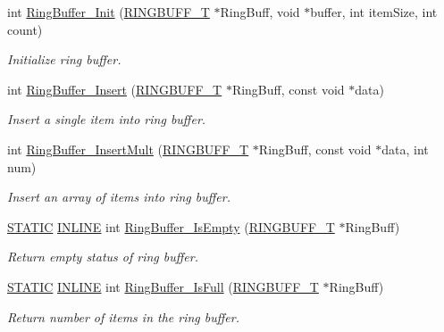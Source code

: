 \begin{DoxyCompactItemize}
int \hyperlink{group__Ring__Buffer_gaaf3bb51f2228ea1bea603e19c7eba5bb}{Ring\+Buffer\+\_\+\+Init} (\hyperlink{structRINGBUFF__T}{R\+I\+N\+G\+B\+U\+F\+F\+\_\+T} $\ast$Ring\+Buff, void $\ast$buffer, int item\+Size, int count)
\begin{DoxyCompactList}\small\item\em Initialize ring buffer. \end{DoxyCompactList}\item 
int \hyperlink{group__Ring__Buffer_gaafdee54f2525b2c7a983d1a631b42226}{Ring\+Buffer\+\_\+\+Insert} (\hyperlink{structRINGBUFF__T}{R\+I\+N\+G\+B\+U\+F\+F\+\_\+T} $\ast$Ring\+Buff, const void $\ast$data)
\begin{DoxyCompactList}\small\item\em Insert a single item into ring buffer. \end{DoxyCompactList}\item 
int \hyperlink{group__Ring__Buffer_gafeafb521d4e03052ab2c893fd0e388d5}{Ring\+Buffer\+\_\+\+Insert\+Mult} (\hyperlink{structRINGBUFF__T}{R\+I\+N\+G\+B\+U\+F\+F\+\_\+T} $\ast$Ring\+Buff, const void $\ast$data, int num)
\begin{DoxyCompactList}\small\item\em Insert an array of items into ring buffer. \end{DoxyCompactList}\item 
\hyperlink{group__LPC__Types__Public__Macros_ga10b2d890d871e1489bb02b7e70d9bdfb}{S\+T\+A\+T\+IC} \hyperlink{group__LPC__Types__Public__Types_ga2eb6f9e0395b47b8d5e3eeae4fe0c116}{I\+N\+L\+I\+NE} int \hyperlink{group__Ring__Buffer_ga6f03e04a69262864bde4f35fc6f3dfb5}{Ring\+Buffer\+\_\+\+Is\+Empty} (\hyperlink{structRINGBUFF__T}{R\+I\+N\+G\+B\+U\+F\+F\+\_\+T} $\ast$Ring\+Buff)
\begin{DoxyCompactList}\small\item\em Return empty status of ring buffer. \end{DoxyCompactList}\item 
\hyperlink{group__LPC__Types__Public__Macros_ga10b2d890d871e1489bb02b7e70d9bdfb}{S\+T\+A\+T\+IC} \hyperlink{group__LPC__Types__Public__Types_ga2eb6f9e0395b47b8d5e3eeae4fe0c116}{I\+N\+L\+I\+NE} int \hyperlink{group__Ring__Buffer_ga760da012435262add1d8d7aa79e873a0}{Ring\+Buffer\+\_\+\+Is\+Full} (\hyperlink{structRINGBUFF__T}{R\+I\+N\+G\+B\+U\+F\+F\+\_\+T} $\ast$Ring\+Buff)
\begin{DoxyCompactList}\small\item\em Return number of items in the ring buffer. \end{DoxyCompactList}\item 

\end{DoxyCompactItemize}
